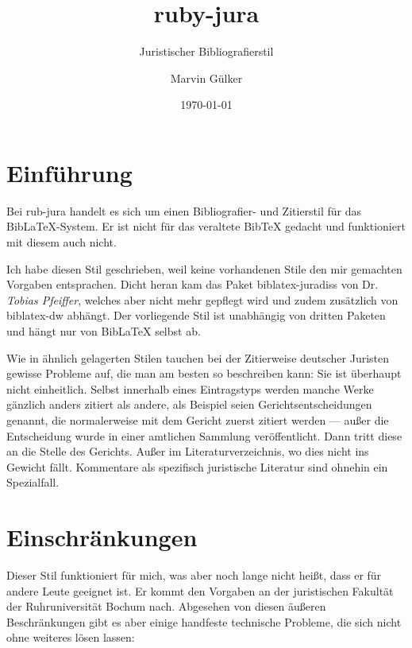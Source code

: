 \documentclass[11pt,a4paper,DIV=calc]{scrartcl}
\newcommand\software[1]{\textsf{#1}}
\newcommand\rj{\software{rub-jura}\xspace}
\newcommand\Biblatex{\software{Bib\LaTeX{}}\xspace}
\newcommand\name[1]{\textit{#1}}
\begin{document}
\title{ruby-jura}
\subtitle{Juristischer Bibliografierstil}
\author{Marvin Gülker}
\date{\today}
\maketitle{}

\tableofcontents{}

\section{Einführung}

Bei \rj handelt es sich um einen Bibliografier- und Zitierstil für das
\Biblatex-System. Er ist nicht für das veraltete \software{Bib\TeX{}}
gedacht und funktioniert mit diesem auch nicht.

Ich habe diesen Stil geschrieben, weil keine vorhandenen Stile den mir
gemachten Vorgaben entsprachen. Dicht heran kam das Paket
\software{biblatex-juradiss} von Dr. \name{Tobias Pfeiffer}, welches
aber nicht mehr gepflegt wird und zudem zusätzlich von
\software{biblatex-dw} abhängt. Der vorliegende Stil ist unabhängig
von dritten Paketen und hängt nur von \Biblatex selbst ab.

Wie in ähnlich gelagerten Stilen tauchen bei der Zitierweise deutscher
Juristen gewisse Probleme auf, die man am besten so beschreiben kann:
Sie ist überhaupt nicht einheitlich. Selbst innerhalb eines
Eintragstyps werden manche Werke gänzlich anders zitiert als andere,
als Beispiel seien Gerichtsentscheidungen genannt, die normalerweise
mit dem Gericht zuerst zitiert werden — außer die Entscheidung wurde
in einer amtlichen Sammlung veröffentlicht. Dann tritt diese an die
Stelle des Gerichts. Außer im Literaturverzeichnis, wo dies nicht ins
Gewicht fällt. Kommentare als spezifisch juristische Literatur sind
ohnehin ein Spezialfall.

\section{Einschränkungen}

Dieser Stil funktioniert für mich, was aber noch lange nicht heißt,
dass er für andere Leute geeignet ist. Er kommt den Vorgaben an der
juristischen Fakultät der Ruhruniversität Bochum nach. Abgesehen von
diesen äußeren Beschränkungen gibt es aber einige handfeste technische
Probleme, die sich nicht ohne weiteres lösen lassen:
\end{document}
